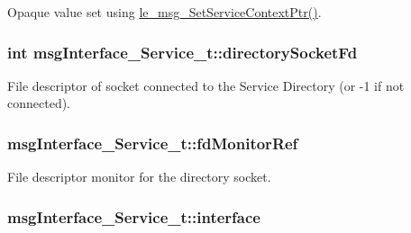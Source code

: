 Opaque value set using \hyperlink{le__messaging_8h_a9233d283c260a1983c594b4a9061374a}{le\+\_\+msg\+\_\+\+Set\+Service\+Context\+Ptr()}. 

\subsubsection[{\texorpdfstring{directory\+Socket\+Fd}{directorySocketFd}}]{\setlength{\rightskip}{0pt plus 5cm}int msg\+Interface\+\_\+\+Service\+\_\+t\+::directory\+Socket\+Fd}\hypertarget{structmsg_interface___service__t_ada59f927efc70ba333c71437003186d5}{}\label{structmsg_interface___service__t_ada59f927efc70ba333c71437003186d5}
File descriptor of socket connected to the Service Directory (or -\/1 if not connected). 
\subsubsection[{\texorpdfstring{fd\+Monitor\+Ref}{fdMonitorRef}}]{ msg\+Interface\+\_\+\+Service\+\_\+t\+::fd\+Monitor\+Ref}\hypertarget{structmsg_interface___service__t_a0e41c9fe5191e934c466d43b09d7b2ba}{}\label{structmsg_interface___service__t_a0e41c9fe5191e934c466d43b09d7b2ba}


File descriptor monitor for the directory socket. 

\subsubsection[{\texorpdfstring{interface}{interface}}]{ msg\+Interface\+\_\+\+Service\+\_\+t\+::interface}\hypertarget{structmsg_interface___service__t_ab0defc7b2d79313cefe6293c50cdffb2}{}\label{structmsg_interface___service__t_ab0defc7b2d79313cefe6293c50cdffb2}


